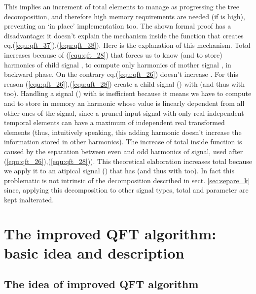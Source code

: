 \documentclass[a4paper,10pt]{article}
\begin{document}
This implies an increment of total elements to manage as progressing the tree decomposition, and therefore high memory requirements
are needed (if  is high), preventing an `in place' implementation too.
The shown formal proof has a disadvantage: it doesn't explain the mechanism inside the  function that creates eq.(\ref{equ:qft_37}),(\ref{equ:qft_38}). 
Here is the explanation of this mechanism.
Total  increases because of (\ref{equ:qft_28}) that forces us to know (and to store)  harmonics of child signal , to compute only  harmonics of mother signal , in backward phase.
On the contrary eq.(\ref{equ:qft_26}) doesn't increase .
For this reason (\ref{equ:qft_26}),(\ref{equ:qft_28}) create a child signal () with  (and thus with  too).
Handling a signal () with  is inefficient because it means we have to compute and to store in memory an harmonic  whose  value is linearly dependent from all other ones of the signal, since a pruned input signal with only  real independent temporal elements can have a maximum of  independent real transformed elements (thus, intuitively speaking, this adding harmonic doesn't increase the information stored in other harmonics).
The increase of total  inside  function is caused by the separation between even and odd harmonics of  signal, used after (\ref{equ:qft_26}),(\ref{equ:qft_28})).
This theoretical elaboration increases total  because we apply it to an atipical signal () that has  (and thus with  too).
In fact this problematic is not intrinsic of the decomposition described in sect. \ref{sec:separe_k} since, applying this decomposition to other signal types, total  and  parameter are kept inalterated.






















 
\section{The improved QFT algorithm: basic idea and description} \label{sec:improved_QFT}

\subsection{The idea of improved QFT algorithm}
\end{document}
